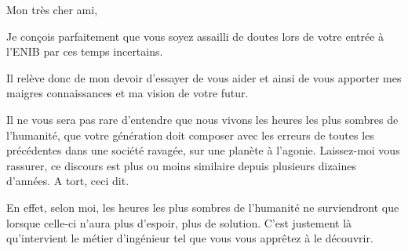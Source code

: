 %
%
%


Mon très cher ami,

Je conçois parfaitement que vous soyez assailli de doutes lors de votre entrée à l'ENIB par ces temps incertains.

Il relève donc de mon devoir d'essayer de vous aider et ainsi de vous apporter mes maigres connaissances et ma vision de votre futur.

Il ne vous sera pas rare d'entendre que nous vivons les heures les plus sombres de l'humanité, que votre génération doit composer avec les erreurs de
toutes les précédentes dans une société ravagée, sur une planète à l'agonie.
Laissez-moi vous rassurer, ce discours est plus ou moins similaire depuis plusieurs dizaines d'années. A tort, ceci dit.

En effet, selon moi, les heures les plus sombres de l'humanité ne surviendront que lorsque celle-ci n'aura plus d'espoir, plus de solution.
C'est justement là qu'intervient le métier d'ingénieur tel que vous vous apprêtez à le découvrir.

